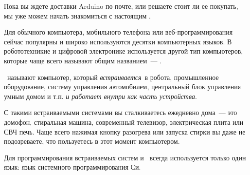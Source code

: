 \secdown

Пока вы ждете доставки Arduino по почте, или решаете стоит ли ее покупать, мы
уже можем начать знакомиться с настоящим . 

\label{embed}

Для обычного компьютера, мобильного телефона или веб-программирования сейчас
популярны и широко используются десятки компьютерных языков. В робототехникие и
цифровой электронике используется другой тип компьютеров, которые чаще всего
называют общим названием\ --- .

\begin{framed}
\noindent{}\ называют компьютер, который \emph{встраивается}\ в робота,
промышленное оборудование, систему управления автомобилем, центральный блок
управления умным домом и т.п. \emph{и работает внутри как часть устройства}.
\end{framed}

С такими встраиваемыми системами вы сталкиваетесь ежедневно дома\ --- это
домофон, стиральная машина, современный телевизор, электрическая плита или СВЧ
печь. Чаще всего нажимая кнопку разогрева или запуска стирки вы даже не
подозреваете, что пользуетесь в этот момент компьютером.

Для программирования встраиваемых систем и \ всегда
используется только один язык: язык системного программирования Си. 

\secup
